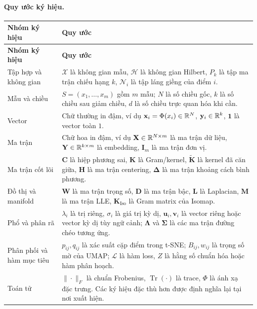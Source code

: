 \paragraph{Quy ước ký hiệu.}
\begingroup
\small
\renewcommand{\arraystretch}{1.08}
\setlength{\tabcolsep}{4pt}
\setlength{\LTleft}{0pt plus 1fill}
\setlength{\LTright}{0pt plus 1fill}
\begin{longtable}{|p{}|p{}|}
\hline
\rowcolor{yellow!35}
\textbf{Nhóm ký hiệu} & \textbf{Quy ước} \\
\hline
\endfirsthead
\hline
\rowcolor{yellow!35}
\textbf{Nhóm ký hiệu} & \textbf{Quy ước} \\
\hline
\endhead
Tập hợp và không gian &
$\mathcal{X}$ là không gian mẫu, $\mathcal{H}$ là không gian Hilbert, $P_k$ là tập ma trận chiếu hạng $k$, $\mathcal{N}_i$ là tập láng giềng của điểm $i$. \\
\hline
Mẫu và chiều &
$S=(x_1,\ldots,x_m)$ gồm $m$ mẫu; $N$ là số chiều gốc, $k$ là số chiều sau giảm chiều, $d$ là số chiều trực quan hóa khi cần. \\
\hline
Vector &
Chữ thường in đậm, ví dụ $\mathbf{x}_i=\Phi(x_i)\in\mathbb{R}^N$, $\mathbf{y}_i\in\mathbb{R}^k$, $\mathbf{1}$ là vector toàn $1$. \\
\hline
Ma trận &
Chữ hoa in đậm, ví dụ $\mathbf{X}\in\mathbb{R}^{N\times m}$ là ma trận dữ liệu, $\mathbf{Y}\in\mathbb{R}^{k\times m}$ là embedding, $\mathbf{I}_m$ là ma trận đơn vị. \\
\hline
Ma trận cốt lõi &
$\mathbf{C}$ là hiệp phương sai, $\mathbf{K}$ là Gram/kernel, $\widetilde{\mathbf{K}}$ là kernel đã căn giữa, $\mathbf{H}$ là ma trận centering, $\boldsymbol{\Delta}$ là ma trận khoảng cách bình phương. \\
\hline
Đồ thị và manifold &
$\mathbf{W}$ là ma trận trọng số, $\mathbf{D}$ là ma trận bậc, $\mathbf{L}$ là Laplacian, $\mathbf{M}$ là ma trận LLE, $\mathbf{K}_{\mathrm{Iso}}$ là Gram matrix của Isomap. \\
\hline
Phổ và phân rã &
$\lambda_i$ là trị riêng, $\sigma_i$ là giá trị kỳ dị, $\mathbf{u}_i,\mathbf{v}_i$ là vector riêng hoặc vector kỳ dị tùy ngữ cảnh; $\boldsymbol{\Lambda}$ và $\boldsymbol{\Sigma}$ là các ma trận đường chéo tương ứng. \\
\hline
Phân phối và hàm mục tiêu &
$p_{ij},q_{ij}$ là xác suất cặp điểm trong t-SNE; $B_{ij},w_{ij}$ là trọng số mờ của UMAP; $\mathcal{L}$ là hàm loss, $Z$ là hằng số chuẩn hóa hoặc hàm phân hoạch. \\
\hline
Toán tử &
$\|\cdot\|_F$ là chuẩn Frobenius, $\operatorname{Tr}(\cdot)$ là trace, $\Phi$ là ánh xạ đặc trưng. Các ký hiệu đặc thù hơn được định nghĩa lại tại nơi xuất hiện. \\
\hline
\end{longtable}
\endgroup

